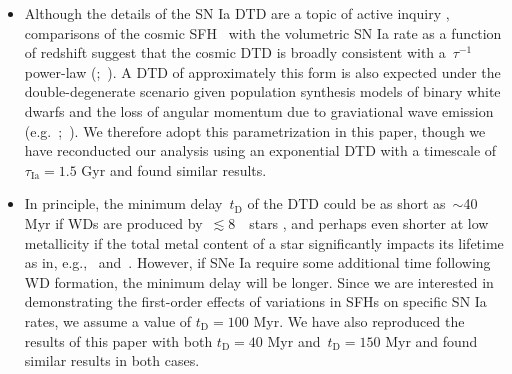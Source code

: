 \documentclass[ms.tex]{subfiles}
\begin{document}
\begin{itemize}
	\item Although the details of the SN Ia DTD are a topic of active inquiry
	\citep[e.g.][]{Greggio2005, Strolger2020, Freundlich2021}, comparisons of
	the cosmic SFH~\citep[e.g.][]{Madau2014, Madau2017} with the volumetric SN
	Ia rate as a function of redshift suggest that the cosmic DTD is broadly
	consistent with a~$\tau^{-1}$ power-law (\citealp*{Maoz2012a, Maoz2012b,
	Graur2013};~\citealp{Graur2014}).
	A DTD of approximately this form is also expected under the
	double-degenerate scenario given population synthesis models of binary
	white dwarfs and the loss of angular momentum due to graviational wave
	emission (e.g.~\citealp{Mennekens2010};~\citealp*{Maoz2014}).
	We therefore adopt this parametrization in this paper, though we have
	reconducted our analysis using an exponential DTD with a timescale of
	$\tau_\text{Ia} = 1.5$ Gyr and found similar results.
	
	\item In principle, the minimum delay~$t_\text{D}$ of the DTD could be as
	short as~$\sim$40 Myr if WDs are produced by~$\lesssim$8~\msun~stars
	\citep*[e.g.][]{Hurley2000}, and perhaps even shorter at low metallicity if
	the total metal content of a star significantly impacts its lifetime as in,
	e.g.,~\citet{Kodama1997} and~\citet{Vincenzo2016}.
	However, if SNe Ia require some additional time following WD formation, the
	minimum delay will be longer.
	Since we are interested in demonstrating the first-order effects of
	variations in SFHs on specific SN Ia rates, we assume a value of
	$t_\text{D} = 100$ Myr.
	We have also reproduced the results of this paper with both
	$t_\text{D} = 40$ Myr and~$t_\text{D} = 150$ Myr and found similar results
	in both cases.


\end{itemize}
\end{document}
